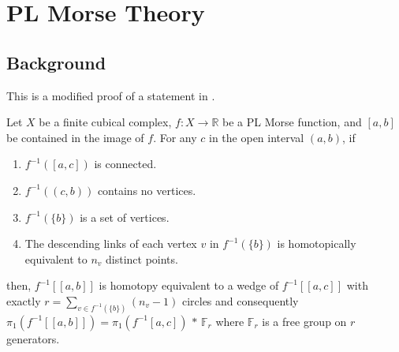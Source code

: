 \chapter{PL Morse Theory}

\section{Background}

This is a modified proof of a statement in \cite{appiah2024algebraicstructurehyperbolicgraph}.
\begin{thm}
\label{thm:descendinglinks}
Let \(X\) be a finite cubical complex,
\(f: X \rightarrow \mathbb{R}\) be a PL Morse function,
and \([a,b]\) be contained in the image of \(f\). 
For any \(c\) in the open interval \((a,b)\), if
\begin{enumerate}
    \item \(f^{-1}([a,c])\) is connected.
    \item \(f^{-1}((c,b))\) contains no vertices.
    \item \(f^{-1}(\{b\})\) is a set of vertices.
    \item The descending links of each vertex \(v\) in \(f^{-1}(\{b\})\) 
        is homotopically equivalent to \(n_v\) distinct points.
\end{enumerate}
then, \(f^{-1}[[a,b]]\) is homotopy equivalent to a wedge of \(f^{-1}[[a,c]]\)
with exactly \(\displaystyle r = \sum_{v \in f^{-1}(\{b\})} (n_v - 1)\) circles and consequently
\(\pi_1(f^{-1}[[a,b]]) = \pi_1(f^{-1}[a,c])\,*\,\mathbb{F}_r\)
where \(\mathbb{F}_r\) is a free group on \(r\) generators.
\end{thm}

